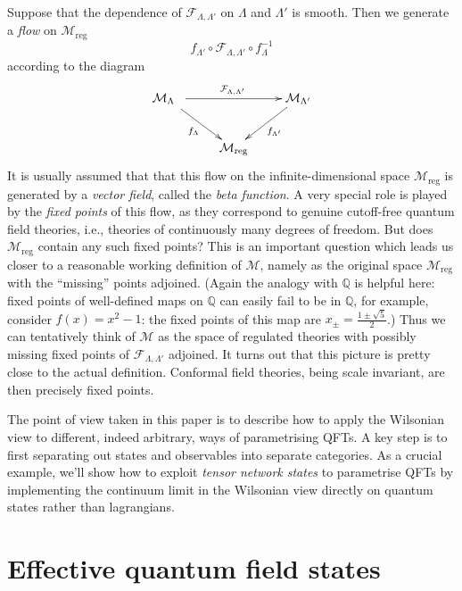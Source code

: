 \documentclass[11pt]{amsart}
\theoremstyle{plain}%
\theoremstyle{definition}
\theoremstyle{remark}
\begin{document}
Suppose that the dependence of $\mathcal{F}_{\Lambda,\Lambda'}$ on $\Lambda$ and $\Lambda'$ is smooth.  Then we generate a \emph{flow} on $\mathcal{M}_{\text{reg}}$ 
\begin{equation}
	f_{\Lambda'}\circ \mathcal{F}_{\Lambda,\Lambda'}\circ f_\Lambda^{-1}   
\end{equation}   
according to the diagram
\begin{equation}
\xymatrix{
\mathcal{M}_{\Lambda} \ar[rr]^{\mathcal{F}_{\Lambda,\Lambda'}}
\ar[dr]_{f_\Lambda}\hole
&& \mathcal{M}_{\Lambda'} \ar[dl]^{f_{\Lambda'}}\\
& \mathcal{M}_{\text{reg}} }
\end{equation}
It is usually assumed  that that this flow on the infinite-dimensional space $\mathcal{M}_{\text{reg}}$ is generated by a \emph{vector field}, called the \emph{beta function}. A very special role is played by the \emph{fixed points} of this flow, as they correspond to genuine cutoff-free quantum field theories, i.e., theories of continuously many degrees of freedom. But does $\mathcal{M}_{\text{reg}}$ contain any such fixed points? This is an important question which leads us closer to a reasonable working definition of $\mathcal{M}$, namely as the original space $\mathcal{M}_{\text{reg}}$ with the ``missing'' points adjoined. (Again the analogy with $\mathbb{Q}$ is helpful here: fixed points of well-defined maps on $\mathbb{Q}$ can easily fail to be in $\mathbb{Q}$, for example, consider $f(x) = x^2-1$: the fixed points of this map are $x_{\pm} = \frac{1\pm\sqrt{5}}{2}$.) Thus we can tentatively think of $\mathcal{M}$ as the space of regulated theories with possibly missing fixed points of $\mathcal{F}_{\Lambda,\Lambda'}$ adjoined. It turns out that this picture is pretty close to the actual definition. Conformal field theories, being scale invariant, are then precisely fixed points.

The point of view taken in this paper is to describe how to apply the Wilsonian view to different, indeed arbitrary, ways of parametrising QFTs. A key step is to first separating out states and observables into separate categories. As a crucial example, we'll show how to exploit \emph{tensor network states} to parametrise QFTs by implementing the continuum limit in the Wilsonian view directly on quantum states rather than lagrangians.

\section{Effective quantum field states}\label{sec:effectiveqftstates}
\end{document}
